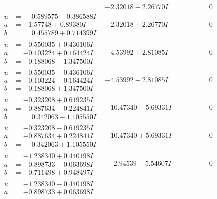 \documentclass[1p]{elsarticle_modified}
\theoremstyle{definition}
\begin{document}
$$\begin{array}{c|c|c}
 & -2.32018 - 2.26770 I & \phantom{-0.000000 } 0 \\ \hline\begin{aligned}
u &= \phantom{-}0.589575 - 0.386588 I \\
a &= -1.57748 + 0.89380 I \\
b &= \phantom{-}0.455789 + 0.714399 I\end{aligned}
 & -2.32018 + 2.26770 I & \phantom{-0.000000 } 0 \\ \hline\begin{aligned}
u &= -0.550035 + 0.436106 I \\
a &= -0.103224 + 0.164424 I \\
b &= -0.188068 - 1.347500 I\end{aligned}
 & -4.53992 + 2.81085 I & \phantom{-0.000000 } 0 \\ \hline\begin{aligned}
u &= -0.550035 - 0.436106 I \\
a &= -0.103224 - 0.164424 I \\
b &= -0.188068 + 1.347500 I\end{aligned}
 & -4.53992 - 2.81085 I & \phantom{-0.000000 } 0 \\ \hline\begin{aligned}
u &= -0.323208 + 0.619235 I \\
a &= -0.887634 - 0.224841 I \\
b &= \phantom{-}0.342063 - 1.105550 I\end{aligned}
 & -10.47340 - 5.69331 I & \phantom{-0.000000 } 0 \\ \hline\begin{aligned}
u &= -0.323208 - 0.619235 I \\
a &= -0.887634 + 0.224841 I \\
b &= \phantom{-}0.342063 + 1.105550 I\end{aligned}
 & -10.47340 + 5.69331 I & \phantom{-0.000000 } 0 \\ \hline\begin{aligned}
u &= -1.238340 + 0.440198 I \\
a &= -0.898733 - 0.063698 I \\
b &= -0.711498 + 0.948497 I\end{aligned}
 & \phantom{-}2.94539 - 5.54607 I & \phantom{-0.000000 } 0 \\ \hline\begin{aligned}
u &= -1.238340 - 0.440198 I \\
a &= -0.898733 + 0.063698 I \\

\end{aligned}
\end{array}$$
\end{document}
